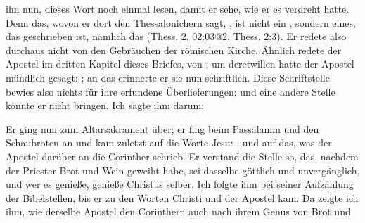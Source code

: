ihn nun, dieses Wort noch einmal lesen, damit er sehe, wie er es
verdreht hatte. Denn das, wovon er dort den Thessalonichern
sagt, , ist nicht ein 
, sondern eines, das geschrieben 
ist, nämlich das  (Thess. 2. 02:03@2. Thess. 2:3). 
Er redete also durchaus nicht von den Gebräuchen der römischen Kirche.
  Ähnlich redete
der Apostel im dritten Kapitel dieses Briefes, von ; um deretwillen hatte
der Apostel mündlich gesagt: ; an das erinnerte er sie nun schriftlich. 
Diese Schriftstelle
bewies also nichts für ihre erfundene Überlieferungen; und eine andere
Stelle konnte er nicht bringen. Ich sagte ihm darum: 

Er ging nun zum Altarsakrament über; er fing beim Passalamm
und den Schaubroten an und kam zuletzt auf die Worte Jesu:
, und auf das, was der Apostel darüber an
die Corinther schrieb. Er verstand die Stelle so, das, nachdem der
Priester Brot und Wein geweiht habe, sei dasselbe göttlich und
unvergänglich, und wer es genieße, genieße Christus selber. Ich
folgte ihm bei seiner Aufzählung der Bibelstellen, bis er zu den
Worten Christi und der Apostel kam. Da zeigte ich ihm, wie
derselbe Apostel den Corinthern auch nach ihrem Genus von Brot und


